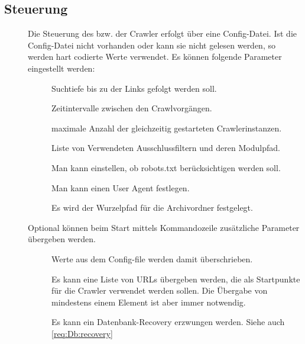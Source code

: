 \subsection{Steuerung}
\begin{description}
	\item []
		Die Steuerung des bzw. der Crawler erfolgt über eine Config-Datei.
		Ist die Config-Datei nicht vorhanden oder kann sie nicht gelesen werden,
        so werden hart codierte Werte verwendet.
		Es können folgende Parameter eingestellt werden:
		\begin{description}
			\item []
				Suchtiefe bis zu der Links gefolgt werden soll.
			\item []
				Zeitintervalle zwischen den Crawlvorgängen.
			\item []
				maximale Anzahl der gleichzeitig gestarteten Crawlerinstanzen.
			\item []
				Liste von Verwendeten Ausschlussfiltern und deren Modulpfad.
			\item []
				Man kann einstellen, ob robots.txt berücksichtigen werden soll.
			\item []
				Man kann einen User Agent festlegen.
			\item []
				Es wird der Wurzelpfad für die Archivordner festgelegt.
		\end{description}
	\item []
		Optional können beim Start mittels Kommandozeile zusätzliche Parameter übergeben werden.
		\begin{description}
			\item []
				Werte aus dem Config-file werden damit überschrieben.
			\item []
				Es kann eine Liste von URLs übergeben werden, 
				die als Startpunkte für die Crawler verwendet werden sollen.
				Die Übergabe von mindestens einem Element ist aber immer notwendig.
			\item []
				Es kann ein Datenbank-Recovery erzwungen werden. Siehe auch \ref{req:Db:recovery}
		\end{description}
\end{description}

